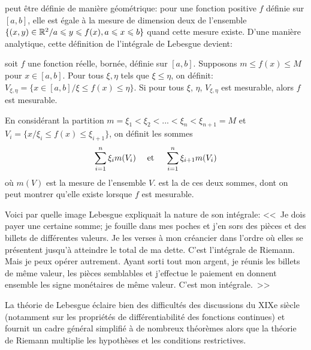 \begin{histoire}
peut être définie de manière géométrique: pour une fonction
positive $f$ définie sur $[a,b]$, elle est égale à la mesure de dimension deux de l'ensemble
$\{(x,y)\in\mathbb R^2 / a\leqslant y\leqslant f(x), a\leqslant x\leqslant b\}$ quand cette mesure existe.
D'une manière analytique, cette définition de l'intégrale de Lebesgue devient:

\begin{definition}
soit $f$ une fonction réelle, bornée, définie sur $[a,b]$.
Supposons $m\le f(x)\le M$ pour $x\in[a,b]$.
Pour tous $\xi, \eta$ tels que $\xi\le\eta$, on définit:
$V_{\xi,\eta}=\{x\in[a,b]/ \xi\le f(x)\le\eta\}$.
Si pour tous $\xi$, $\eta$, $V_{\xi,\eta}$ est mesurable, alors $f$ est mesurable.

En considérant la partition $m=\xi_1<\xi_2<...<\xi_n<\xi_{n+1}=M$ et
$V_i=\{x/ \xi_i\le f(x)\le\xi_{i+1}\}$, on définit les sommes
\begin{equation} \displaystyle\sum_{i=1}^n\xi_i m(V_i) \quad \text{ et }\quad \displaystyle\sum_{i=1}^n\xi_{i+1} m(V_i) \end{equation}
où $m(V)$ est la mesure de l'ensemble $V$.
 est la
 de ces deux sommes, dont on peut montrer qu'elle existe lorsque $f$ est mesurable.
\end{definition}

\medskip
Voici par quelle image Lebesgue
expliquait la nature de son intégrale: <<~Je
dois payer une certaine somme; je fouille dans mes poches et j'en sors des pièces
et des billets de différentes valeurs. Je les verses à mon créancier dans l'ordre où
elles se présentent jusqu'à atteindre le total de ma dette. C'est l'intégrale de
Riemann.
Mais je peux opérer autrement. Ayant sorti tout mon argent, je réunis
les billets de même valeur, les pièces semblables et j'effectue le paiement en
donnent ensemble les signe monétaires de même valeur. C'est mon intégrale.~>>

\medskip
La théorie de Lebesgue
éclaire bien des difficultés des discussions du
XIXe siècle (notamment sur les propriétés de différentiabilité des fonctions
continues) et fournit un cadre général simplifié à  de nombreux théorèmes
alors que la théorie de Riemann
multiplie les hypothèses et les conditions restrictives.


\end{histoire}
